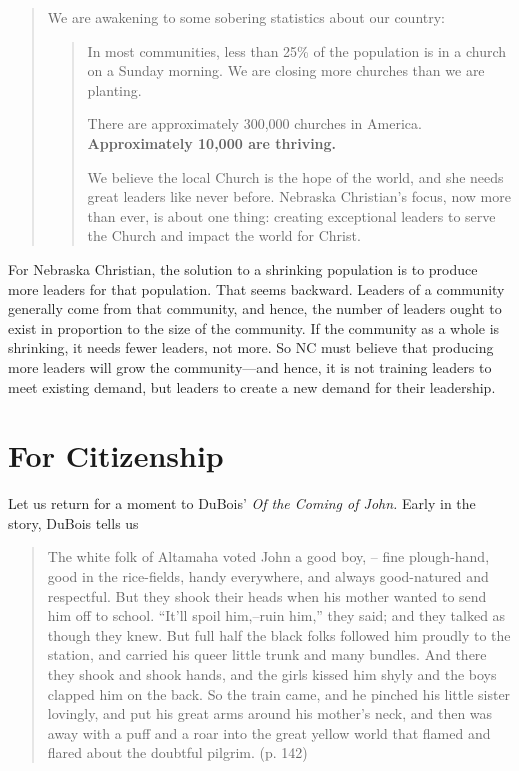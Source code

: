 \begin{quote}

We are awakening to some sobering statistics about our country:

\begin{quote}

In most communities, less than 25\% of the population is in a church on a Sunday morning. We are closing more churches than we are planting.

There are approximately 300,000 churches in America. \textbf{Approximately 10,000 are thriving.}

We believe the local Church is the hope of the world, and she needs great leaders like never before. Nebraska Christian's focus, now more than ever, is about one thing: creating exceptional leaders to serve the Church and impact the world for Christ.
\end{quote}
\end{quote}

For Nebraska Christian, the solution to a shrinking population is to produce more leaders for that population. That seems backward. Leaders of a community generally come from that community, and hence, the number of leaders ought to exist in proportion to the size of the community. If the community as a whole is shrinking, it needs fewer leaders, not more. So NC must believe that producing more leaders will grow the community---and hence, it is not training leaders to meet existing demand, but leaders to create a new demand for their leadership.

\section{For Citizenship}
\label{forcitizenship}

Let us return for a moment to DuBois' \emph{Of the Coming of John.} Early in the story, DuBois tells us

\begin{quote}

The white folk of Altamaha voted John a good boy, -- fine plough-hand, good in the rice-fields, handy everywhere, and always good-natured and respectful. But they shook their heads when his mother wanted to send him off to school. ``It'll spoil him,--ruin him,'' they said; and they talked as though they knew. But full half the black folks followed him proudly to the station, and carried his queer little trunk and many bundles. And there they shook and shook hands, and the girls kissed him shyly and the boys clapped him on the back. So the train came, and he pinched his little sister lovingly, and put his great arms around his mother's neck, and then was away with a puff and a roar into the great yellow world that flamed and flared about the doubtful pilgrim. (p. 142)
\end{quote}

